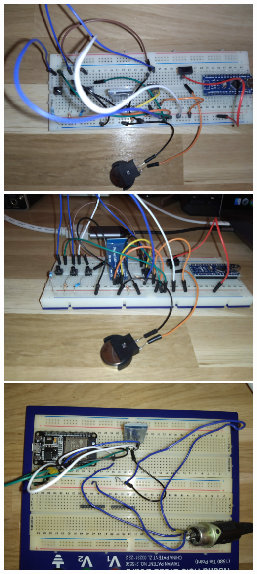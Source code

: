 \documentclass[eng,printmode]{mgr}
\begin{document}
\begin{center}
\includegraphics[width=\textwidth]{nadajnik-1}
\includegraphics[width=\textwidth]{nadajnik-2}
\includegraphics[width=\textwidth]{odbiornik-1}

\end{center}
\end{document}
